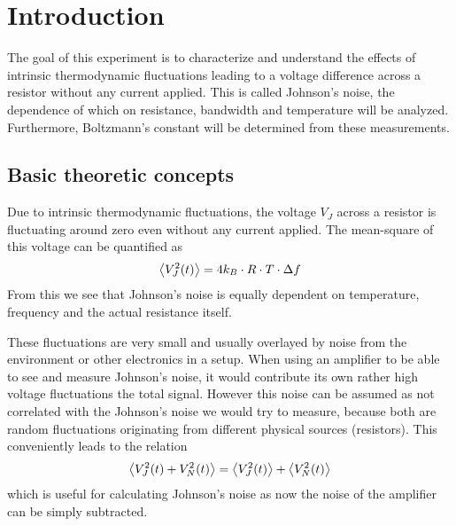 \tableofcontents
\newpage
\listoffigures

\listoftables

\skippage

\setcounter{page}{1}
\restoregeometry
\thispagestyle{fancy}


\section{Introduction}

The goal of this experiment is to characterize and understand the effects of intrinsic thermodynamic fluctuations leading to a voltage difference across a resistor without any current applied. This is called Johnson's noise, the dependence of which on resistance, bandwidth and temperature will be analyzed. Furthermore, Boltzmann's constant will be determined from these measurements.

\subsection{Basic theoretic concepts}

Due to intrinsic thermodynamic fluctuations, the voltage $V_J$ across a resistor is fluctuating around zero even without any current applied. The mean-square of this voltage can be quantified as
\begin{equation}\label{eq:johnson-expval}
	\expval{V_J^2(t)} = 4k_B \cdot R \cdot T \cdot \Delta f
\end{equation}
From this we see that Johnson's noise is equally dependent on temperature, frequency and the actual resistance itself.

These fluctuations are very small and usually overlayed by noise from the environment or other electronics in a setup. When using an amplifier to be able to see and measure Johnson's noise, it would contribute its own rather high voltage fluctuations the total signal. However this noise can be assumed as not correlated with the Johnson's noise we would try to measure, because both are random fluctuations originating from different physical sources (resistors). This conveniently leads to the relation
\begin{equation}
	\expval{V_J^2(t) + V_N^2(t)} = \expval{V_J^2(t)} + \expval{V_N^2(t)}
\end{equation}
which is useful for calculating Johnson's noise as now the noise of the amplifier can be simply subtracted.

